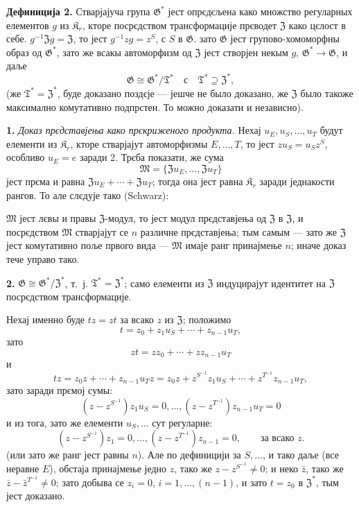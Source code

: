 \documentclass[11pt]{article}
\newcommand{\foreign}[1]{#1}
\begin{document}
\noindent\textbf{Дефиниција 2.} Стварјајуча група \(\mathfrak G^*\) јест опрєдєљена како множство регуларных елементов \(g\) из \(\mathfrak K_r\), кторе посрєдством трансформације прєводет \(\mathfrak Z\) како цєлост в себе. \(g^{-1}\mathfrak Zg=\mathfrak Z\), то јест \(g^{-1}zg=z^S\), с \(S\) в \(\mathfrak G\). зато \(\mathfrak G\) јест групово-хомоморфны образ од \(\mathfrak G^*\), зато же всакы автоморфизм од \(\mathfrak Z\) јест створјен некым \(g\), \(\mathfrak G^*\to\mathfrak G\), и даље
\[
\mathfrak G\cong\mathfrak G^*/\mathfrak T^*
\quad\text{с}\quad
\mathfrak T^*\supseteq\mathfrak Z^*,
\]
(же \(\mathfrak T^*=\mathfrak Z^*\), буде доказано поздєје --- јешче не было доказано, же \(\mathfrak Z\) было такоже максимално комутативно подпрстен. То можно доказати и независно).

\noindent\textbf{1.} \emph{Доказ прєдставјења како прєкриженого продукта.} Нехај \(u_E,u_S,\ldots,u_T\) будут елементи из \(\mathfrak K_r\), кторе стварјајут автоморфизмы \(E,\ldots,T\), то јест \(zu_S=u_Sz^S\), особливо \(u_E=e\) заради 2. Трєба показати, же сума
\[
\mathfrak M=\{\mathfrak Zu_E,\ldots,\mathfrak Zu_T\}
\]
јест прєма и равна \(\mathfrak Zu_E+\cdots+\mathfrak Zu_T\); тогда она јест равна \(\mathfrak K_r\) заради једнакости рангов. То але слєдује тако (\foreign{Schwarz}):

\(\mathfrak M\) јест лєвы и правы \(\mathfrak Z\)-модул, то јест модул прєдставјења од \(\mathfrak Z\) в \(\mathfrak Z\), и посрєдством \(\mathfrak M\) стварјајут се \(n\) различне прєдставјења; тым самым --- зато же \(\mathfrak Z\) јест комутативно поље првого вида --- \(\mathfrak M\) имаје ранг принајмење \(n\); иначе доказ тече управо тако.

\noindent\textbf{2.} \(\mathfrak G\cong\mathfrak G^*/\mathfrak Z^*\), т.~ј. \(\mathfrak T^*=\mathfrak Z^*\); само елементи из \(\mathfrak Z\) индуцирајут идентитет на \(\mathfrak Z\) посрєдством трансформације.

Нехај именно буде \(tz=zt\) за всако \(z\) из \(\mathfrak Z\); положимо
\[
t=z_0+z_1u_S+\cdots+z_{n-1}u_T,
\]
зато
\[
zt=zz_0+\cdots+zz_{n-1}u_T
\]
и
\[
tz=z_0z+\cdots+z_{n-1}u_Tz
=z_0z+z^{S^{-1}}z_1u_S+\cdots+z^{T^{-1}}z_{n-1}u_T,
\]
зато заради прємој сумы:
\[
(z-z^{S^{-1}})z_1u_S=0,\ldots,
(z-z^{T^{-1}})z_{n-1}u_T=0
\]
и из тога, зато же елементи \(u_S,\ldots\) сут регуларне:
\[
(z-z^{S^{-1}})z_1=0,\ldots,
(z-z^{T^{-1}})z_{n-1}=0,
\qquad\text{за всако }z.
\]
(или зато же ранг јест равны \(n\)). Але по дефиницији за \(S,\ldots\), и тако даље (все неравне \(E\)), обстаја принајмење једно \(z\), тако же \(z-z^{S^{-1}}\neq0\); и неко \(\bar z\), тако же \(\bar z-\bar z^{T^{-1}}\neq0\); зато добыва се \(z_i=0\), \(i=1,\ldots,(n-1)\), и зато \(t=z_0\) в \(\mathfrak Z^*\), тым јест доказано.
\end{document}
